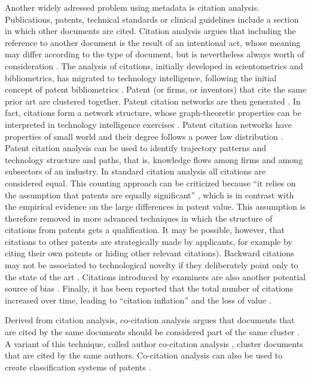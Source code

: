 \documentclass[]{book}
\begin{document}
Another widely adressed problem using metadata is citation analysis.
Publications, patents, technical standards or clinical guidelines
include a section in which other documents are cited. Citation analysis
argues that including the reference to another document is the result of
an intentional act, whose meaning may differ according to the type of
document, but is nevertheless always worth of consideration
\citep{moed2006citation}. The analysis of citations, initially developed
in scientometrics and bibliometrics, has migrated to technology
intelligence, following the initial concept of patent bibliometrics
\citep{narin1994patent}. Patent (or firms, or inventors) that cite the
same prior art are clustered together. Patent citation networks are then
generated \citep{karki1997patent, erdi2013prediction}. In fact,
citations form a network structure, whose graph-theoretic properties can
be interpreted in technology intelligence exercises
\citep{lee2017knowledge}. Patent citation networks have properties of
small world \citep{cowan2004network} and their degree follows a power
law distribution \citep{chen2004tracing}. Patent citation analysis can
be used to identify trajectory patterns and technology structure and
paths, that is, knowledge flows among firms and among subsectors of an
industry. In standard citation analysis all citations are considered
equal. This counting approach can be criticized because ``it relies on
the assumption that patents are equally significant''
\citep{gerken2012new}, which is in contrast with the empirical evidence
on the large differences in patent value. This assumption is therefore
removed in more advanced techniques in which the structure of citations
from patents gets a qualification. It may be possible, however, that
citations to other patents are strategically made by applicants, for
example by citing their own patents or hiding other relevant citations).
Backward citations may not be associated to technological novelty if
they deliberately point only to the state of the art
\citep{rost2011strength}. Citations introduced by examiners are also
another potential source of bias \citep{alcacer2006patent}. Finally, it
has been reported that the total number of citations increased over
time, leading to ``citation inflation'' and the loss of value
\citep{hall2001nber}.

Derived from citation analysis, co-citation analysis argues that
documents that are cited by the same documents should be considered part
of the same cluster \citep{small2006tracking, small1985clustering}. A
variant of this technique, called author co-citation analysis
\citep{white1981author}, cluster documents that are cited by the same
authors. Co-citation analysis can also be used to create classification
systems of patents \citep{lai2005using}.
\end{document}
